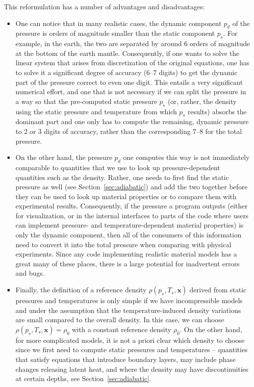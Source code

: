 \documentclass{article}
\begin{document}
This reformulation has a number of advantages and disadvantages:
\begin{itemize}
\item One can notice that in many realistic cases, the dynamic component $p_d$
  of the pressure is orders of magnitude smaller than the static component
  $p_s$. For example, in the earth, the two are separated by around 6 orders
  of magnitude at the bottom of the earth mantle. Consequently, if one wants
  to solve the linear system that arises from discretization of the original
  equations, one has to solve it a significant degree of accuracy (6--7
  digits) to get the dynamic part of the pressure correct to even one
  digit. This entails a very significant numerical effort, and one that is not
  necessary if we can split the pressure in a way so that the pre-computed
  static pressure $p_s$ (or, rather, the density using the static pressure and
  temperature from which $p_s$ results) absorbs the dominant part and one only
  has to compute the remaining, dynamic pressure to 2 or 3 digits of accuracy,
  rather than the corresponding 7--8 for the total pressure.

\item On the other hand, the pressure $p_d$ one computes this way is not immediately
  comparable to quantities that we use to look up pressure-dependent
  quantities such as the density. Rather, one needs to first find the static
  pressure as well (see Section~\ref{sec:adiabatic}) and add the two together
  before they can be used to look up material properties or to compare them with
  experimental results. Consequently, if the pressure a program outputs
  (either for visualization, or in the internal interfaces to parts of the
  code where users can implement pressure- and temperature-dependent material
  properties) is only the dynamic component, then all of the consumers of this
  information need to convert it into the total pressure when comparing with
  physical experiments. Since any code implementing realistic material models
  has a great many of these places, there is a large potential for inadvertent
  errors and bugs.

\item Finally, the definition of a reference density $\rho(p_s,T_s,\mathbf x)$
  derived from static pressures and temperatures
  is only simple if we have incompressible models and under the assumption
  that the temperature-induced density variations are small compared to the
  overall density. In this case, we can choose $\rho(p_s,T_s,\mathbf
  x)=\rho_0$ with a constant reference density $\rho_0$. On the other hand,
  for more complicated models, it is not a priori
  clear which density to choose since we first need to compute static
  pressures and temperatures -- quantities that satisfy equations that
  introduce boundary layers, may include phase changes releasing latent heat,
  and where the density may have discontinuities at certain depths, see
  Section~\ref{sec:adiabatic}.


\end{itemize}
\end{document}
